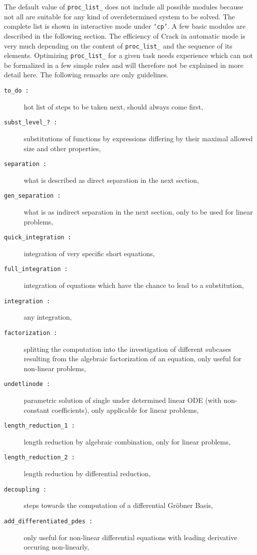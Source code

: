 \documentclass[12pt]{article}
\begin{document}
The default value of {\tt proc\_list\_} does not include all possible
modules because not all are suitable for any kind of overdetermined
system to be solved. The complete list is shown in interactive mode
under {\tt `cp'}. A few basic modules are described in the following
section. The efficiency of {\sc Crack} in automatic mode is very much
depending on the content of {\tt proc\_list\_} and the sequence of its
elements. Optimizing {\tt proc\_list\_} for a given task needs
experience which can not be formalized in a few simple rules and will
therefore not be explained in more detail here. The following remarks
are only guidelines.
\begin{description}    
\item[{\tt to\_do :}] hot list of steps to be taken next, should
always come first,
\item[{\tt subst\_level\_? :}] substitutions of functions by
expressions differing by their maximal allowed size and other
properties,
\item[{\tt separation :}] what is described as direct separation in the
next section,
\item[{\tt gen\_separation :}] what is as indirect separation in the
next section, only to be used for linear problems,
\item[{\tt quick\_integration :}] integration of very specific short equations,
\item[{\tt full\_integration :}] integration of equations which have
the chance to lead to a substitution,
\item[{\tt integration :}] any integration,
\item[{\tt factorization :}] splitting the computation into the
investigation of different subcases resulting from the algebraic
factorization of an equation, only useful for non-linear problems,
\item[{\tt undetlinode :}]  parametric solution of single under determined
linear ODE (with non-constant coefficients), only applicable for
linear problems,
\item[{\tt length\_reduction\_1 :}] length reduction by algebraic
combination, only for linear problems,
\item[{\tt length\_reduction\_2 :}] length reduction by differential
reduction,
\item[{\tt decoupling :}] steps towards the computation of a
differential Gr\"{o}bner Basis,
\item[{\tt add\_differentiated\_pdes :}] only useful for non-linear
differential equations with leading derivative occuring non-linearly,

\end{description}
\end{document}
